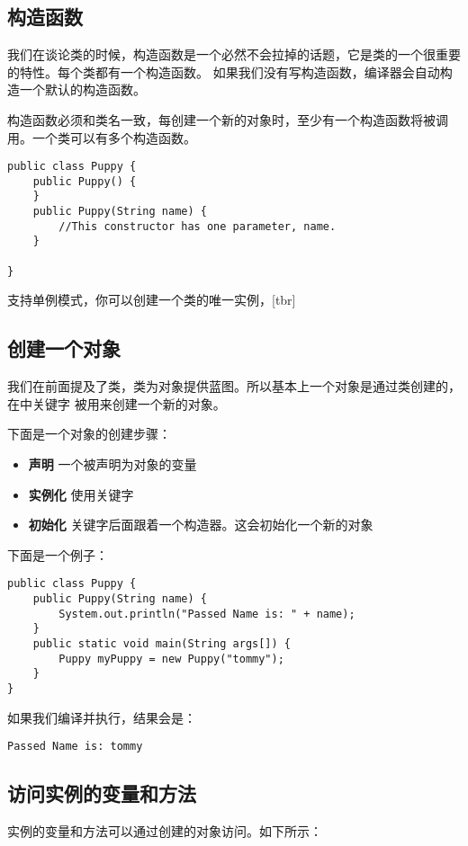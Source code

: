 \documentclass{article}
\begin{document}
\subsection{构造函数}
我们在谈论类的时候，构造函数是一个必然不会拉掉的话题，它是类的一个很重要的特性。每个类都有一个构造函数。
如果我们没有写构造函数，编译器会自动构造一个默认的构造函数。

构造函数必须和类名一致，每创建一个新的对象时，至少有一个构造函数将被调用。一个类可以有多个构造函数。

\begin{verbatim}
public class Puppy {
	public Puppy() {
	}
	public Puppy(String name) {
		//This constructor has one parameter, name.
	}

}
\end{verbatim}

 支持单例模式，你可以创建一个类的唯一实例，[tbr]

\subsection{创建一个对象}
我们在前面提及了类，类为对象提供蓝图。所以基本上一个对象是通过类创建的，在中关键字
被用来创建一个新的对象。

下面是一个对象的创建步骤：
\begin{itemize}
\item {\bf 声明} 一个被声明为对象的变量
\item {\bf 实例化} 使用关键字
\item {\bf 初始化} 关键字后面跟着一个构造器。这会初始化一个新的对象
\end{itemize}
下面是一个例子：

\begin{verbatim}
public class Puppy {
	public Puppy(String name) {
		System.out.println("Passed Name is: " + name);
	}
	public static void main(String args[]) {
		Puppy myPuppy = new Puppy("tommy");
	}
}
\end{verbatim}

如果我们编译并执行，结果会是：

\begin{verbatim}
Passed Name is: tommy
\end{verbatim}

\subsection{访问实例的变量和方法}
实例的变量和方法可以通过创建的对象访问。如下所示：
\end{document}
